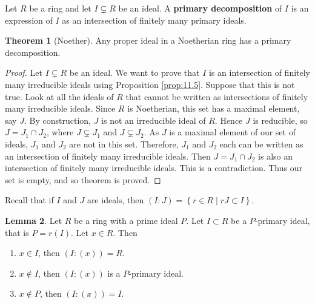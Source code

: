 \documentclass{article}
\newcommand{\rb}[1]{\left( #1 \right)}
\newcommand{\cb}[1]{\left\{ #1 \right\}}
\theoremstyle{definition}\newtheorem{definition}{Definition}[section]
\theoremstyle{definition}\newtheorem{remark}[definition]{Remark}
\theoremstyle{definition}\newtheorem*{example}{Example}
\theoremstyle{definition}\newtheorem*{note}{Note}
\newtheorem{lemma}[definition]{Lemma}
\newtheorem{theorem}[definition]{Theorem}
\begin{document}
Let $ R $ be a ring and let $ I \subsetneq R $ be an ideal. A \textbf{primary decomposition} of $ I $ is an expression of $ I $ as an intersection of finitely many primary ideals.

\begin{theorem}[Noether]
Any proper ideal in a Noetherian ring has a primary decomposition.
\end{theorem}

\begin{proof}
Let $ I \subsetneq R $ be an ideal. We want to prove that $ I $ is an intersection of finitely many irreducible ideals using Proposition \ref{prop:11.5}. Suppose that this is not true. Look at all the ideals of $ R $ that cannot be written as intersections of finitely many irreducible ideals. Since $ R $ is Noetherian, this set has a maximal element, say $ J $. By construction, $ J $ is not an irreducible ideal of $ R $. Hence $ J $ is reducible, so $ J = J_1 \cap J_2 $, where $ J \subsetneq J_1 $ and $ J \subsetneq J_2 $. As $ J $ is a maximal element of our set of ideals, $ J_1 $ and $ J_2 $ are not in this set. Therefore, $ J_1 $ and $ J_2 $ each can be written as an intersection of finitely many irreducible ideals. Then $ J = J_1 \cap J_2 $ is also an intersection of finitely many irreducible ideals. This is a contradiction. Thus our set is empty, and so theorem is proved.
\end{proof}

Recall that if $ I $ and $ J $ are ideals, then $ \rb{I : J} = \cb{r \in R \mid rJ \subset I} $.

\begin{lemma}
\label{lem:11.7}
Let $ R $ be a ring with a prime ideal $ P $. Let $ I \subset R $ be a $ P $-primary ideal, that is $ P = r\rb{I} $. Let $ x \in R $. Then
\begin{enumerate}
\item $ x \in I $, then $ \rb{I : \rb{x}} = R $.
\item $ x \notin I $, then $ \rb{I : \rb{x}} $ is a $ P $-primary ideal.
\item $ x \notin P $, then $ \rb{I : \rb{x}} = I $.
\end{enumerate}
\end{lemma}

\end{document}
